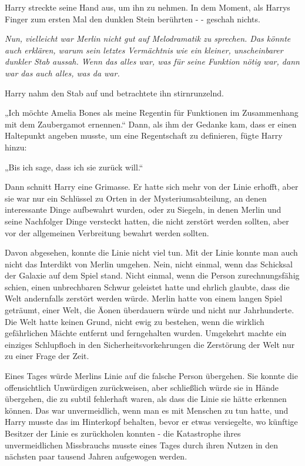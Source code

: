 {Harry streckte seine Hand aus, um ihn zu nehmen. In dem Moment, als Harrys Finger zum ersten Mal den dunklen Stein berührten - - geschah nichts.

\emph{Nun, vielleicht war Merlin nicht gut auf Melodramatik zu sprechen. Das könnte auch erklären, warum sein letztes Vermächtnis wie ein kleiner, unscheinbarer dunkler Stab aussah. Wenn das alles war, was für seine Funktion nötig war, dann war das auch alles, was da war.}

Harry nahm den Stab auf und betrachtete ihn stirnrunzelnd.

„Ich möchte Amelia Bones als meine Regentin für Funktionen im Zusammenhang mit dem Zaubergamot ernennen.“ Dann, als ihm der Gedanke kam, dass er einen Haltepunkt angeben musste, um eine Regentschaft zu definieren, fügte Harry hinzu:

„Bis ich sage, dass ich sie zurück will.“

Dann schnitt Harry eine Grimasse. Er hatte sich mehr von der Linie erhofft, aber sie war nur ein Schlüssel zu Orten in der Mysteriumsabteilung, an denen interessante Dinge aufbewahrt wurden, oder zu Siegeln, in denen Merlin und seine Nachfolger Dinge versteckt hatten, die nicht zerstört werden sollten, aber vor der allgemeinen Verbreitung bewahrt werden sollten.

Davon abgesehen, konnte die Linie nicht viel tun. Mit der Linie konnte man auch nicht das Interdikt von Merlin umgehen. Nein, nicht einmal, wenn das Schicksal der Galaxie auf dem Spiel stand. Nicht einmal, wenn die Person zurechnungsfähig schien, einen unbrechbaren Schwur geleistet hatte und ehrlich glaubte, dass die Welt andernfalls zerstört werden würde. Merlin hatte von einem langen Spiel geträumt, einer Welt, die Äonen überdauern würde und nicht nur Jahrhunderte. Die Welt hatte keinen Grund, nicht ewig zu bestehen, wenn die wirklich gefährlichen Mächte entfernt und ferngehalten wurden. Umgekehrt machte ein einziges Schlupfloch in den Sicherheitsvorkehrungen die Zerstörung der Welt nur zu einer Frage der Zeit.

Eines Tages würde Merlins Linie auf die falsche Person übergehen. Sie konnte die offensichtlich Unwürdigen zurückweisen, aber schließlich würde sie in Hände übergehen, die zu subtil fehlerhaft waren, als dass die Linie sie hätte erkennen können. Das war unvermeidlich, wenn man es mit Menschen zu tun hatte, und Harry musste das im Hinterkopf behalten, bevor er etwas versiegelte, wo künftige Besitzer der Linie es zurückholen konnten - die Katastrophe ihres unvermeidlichen Missbrauchs musste eines Tages durch ihren Nutzen in den nächsten paar tausend Jahren aufgewogen werden.

}
